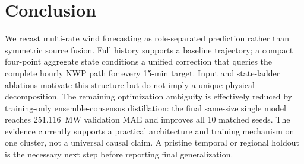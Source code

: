 \documentclass[conference]{IEEEtran}
\begin{document}
\FloatBarrier
\balance
\section{Conclusion}

We recast multi-rate wind forecasting as role-separated prediction rather than symmetric source fusion. Full history supports a baseline trajectory; a compact four-point aggregate state conditions a unified correction that queries the complete hourly NWP path for every 15-min target. Input and state-ladder ablations motivate this structure but do not imply a unique physical decomposition. The remaining optimization ambiguity is effectively reduced by training-only ensemble-consensus distillation: the final same-size single model reaches 251.116~MW validation MAE and improves all 10 matched seeds. The evidence currently supports a practical architecture and training mechanism on one cluster, not a universal causal claim. A pristine temporal or regional holdout is the necessary next step before reporting final generalization.
\end{document}
